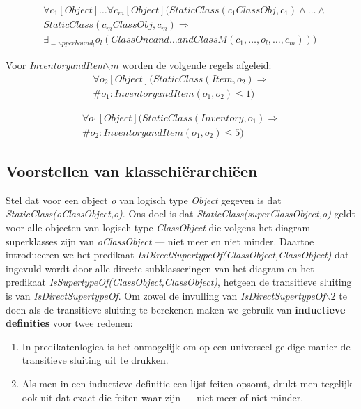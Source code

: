 \begin{itemize}
	\begin{align*}
	&\forall{c_1}[Object]\ldots\forall{c_m}[Object](StaticClass(c_{1}ClassObj,c_1) \land \ldots \land
	\\
	&StaticClass(c_{m}ClassObj,c_m) \Rightarrow \\ &\exists_{=upperbound_l}o_l(ClassOneand\ldots{}andClassM(c_1,\ldots,o_l,\ldots,c_m)))
	\end{align*}
	
	Voor \textit{InventoryandItem$\backslash{}m$} worden de volgende regels afgeleid:
		\begin{align*}
		\forall{o_2}[Object](StaticClass(Item,o_2) \Rightarrow \\ \#{o_1: InventoryandItem(o_1,o_2)} \leq 1)
		\end{align*} 
		
		\begin{align*}
		\forall{o_1}[Object](StaticClass(Inventory,o_1) \Rightarrow \\ \#{o_2: InventoryandItem(o_1,o_2)} \leq 5)
		\end{align*}
\end{itemize}

\subsection{Voorstellen van klassehi\"erarchi\"een}
Stel dat voor een object \textit{o} van logisch type \textit{Object} gegeven is dat \textit{StaticClass(oClassObject,o)}. Ons doel is dat \textit{StaticClass(superClassObject,o)} geldt voor alle objecten van logisch type \textit{ClassObject} die volgens het diagram superklasses zijn van \textit{oClassObject} --- niet meer en niet minder. Daartoe introduceren we het predikaat \textit{IsDirectSupertypeOf(ClassObject,ClassObject)} dat ingevuld wordt door alle directe subklasseringen van het diagram en het predikaat \textit{IsSupertypeOf(ClassObject,ClassObject)}, hetgeen de transitieve sluiting is van \textit{IsDirectSupertypeOf}. Om zowel de invulling van \textit{IsDirectSupertypeOf$\backslash2$} te doen als de transitieve sluiting te berekenen maken we gebruik van \textbf{inductieve definities} voor twee redenen:

\begin{enumerate}
	\item In predikatenlogica is het onmogelijk om op een universeel geldige manier de transitieve sluiting uit te drukken.
	\item Als men in een inductieve definitie een lijst feiten opsomt, drukt men tegelijk ook uit dat exact die feiten waar zijn --- niet meer of niet minder.
\end{enumerate}

